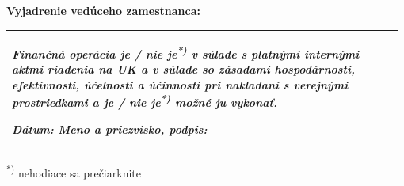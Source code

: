 \documentclass[10pt,a4paper]{article}
\begin{document}
\vspace*{-0.5em}
\textbf{Vyjadrenie vedúceho zamestnanca:}
\vspace*{-1em}

\begin{table}[h!]
\centering
\begin{tabular}{|p{0.975\linewidth}|}
	\hline
	\textit{Finančná operácia \textbf{je / nie je}\textsuperscript{*)} v súlade s platnými internými aktmi riadenia na UK a v súlade so zásadami hospodárnosti, efektívnosti, účelnosti a účinnosti pri nakladaní s verejnými prostriedkami a \textbf{je / nie je}\textsuperscript{*)} možné ju vykonať.}
	
	\textit{Dátum:} \hspace{2cm} \textit{Meno a priezvisko, podpis:} \\ \hline
\end{tabular}
\end{table}
\vspace*{-0.5em}

\textsuperscript{*)} nehodiace sa prečiarknite
\end{document}

